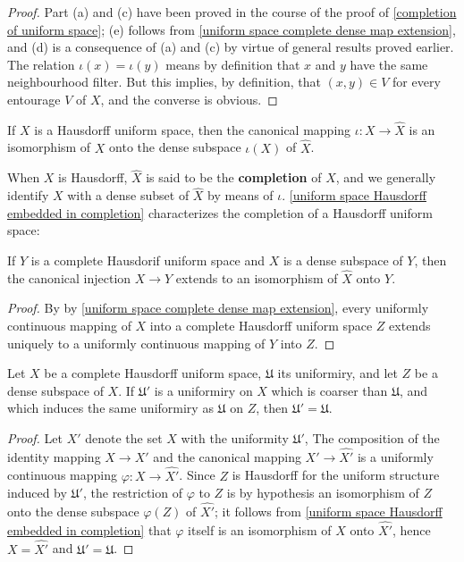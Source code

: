 \begin{proof}
Part (a) and (c) have been proved in the course of the proof of \cref{completion of uniform space}; (e) follows from \cref{uniform space complete dense map extension}, and (d) is a consequence of (a) and (c) by virtue of general results proved earlier. The relation $\iota(x)=\iota(y)$ means by definition that $x$ and $y$ have the same neighbourhood filter. But this implies, by definition, that $(x,y)\in V$ for every entourage $V$ of $X$, and the converse is obvious.
\end{proof}
\begin{corollary}\label{uniform space Hausdorff embedded in completion}
If $X$ is a Hausdorff uniform space, then the canonical mapping $\iota:X\to\widehat{X}$ is an isomorphism of $X$ onto the dense subspace $\iota(X)$ of $\widehat{X}$.
\end{corollary}
When $X$ is Hausdorff, $\widehat{X}$ is said to be the \textbf{completion} of $X$, and we generally identify $X$ with a dense subset of $\widehat{X}$ by means of $\iota$. \cref{uniform space Hausdorff embedded in completion} characterizes the completion of a Hausdorff uniform space:
\begin{proposition}\label{uniform complete Hausdorff dense subspace completion}
If $Y$ is a complete Hausdorif uniform space and $X$ is a dense subspace of $Y$, then the canonical injection $X\to Y$ extends to an isomorphism of $\widehat{X}$ onto $Y$.
\end{proposition}
\begin{proof}
By by \cref{uniform space complete dense map extension}, every uniformly continuous mapping of $X$ into a complete Hausdorff uniform space $Z$ extends uniquely to a uniformly continuous mapping of $Y$ into $Z$.
\end{proof}
\begin{proposition}\label{uniform complete Hausdorff coarser uniformity}
Let $X$ be a complete Hausdorff uniform space, $\mathfrak{U}$ its uniformiry, and let $Z$ be a dense subspace of $X$. If $\mathfrak{U}'$ is a uniformiry on $X$ which is coarser than $\mathfrak{U}$, and which induces the same uniformiry as $\mathfrak{U}$ on $Z$, then $\mathfrak{U}'=\mathfrak{U}$.
\end{proposition}
\begin{proof}
Let $X'$ denote the set $X$ with the uniformity $\mathfrak{U}'$, The composition of the identity mapping $X\to X'$ and the canonical mapping $X'\to\widehat{X'}$ is a uniformly continuous mapping $\varphi:X\to\widehat{X'}$. Since $Z$ is Hausdorff for the uniform structure induced by $\mathfrak{U}'$, the restriction of $\varphi$ to $Z$ is by hypothesis an isomorphism of $Z$ onto the dense subspace $\varphi(Z)$ of $\widehat{X'}$; it follows from \cref{uniform space Hausdorff embedded in completion} that $\varphi$ itself is an isomorphism of $X$ onto $\widehat{X'}$, hence $X=\widehat{X'}$ and $\mathfrak{U}'=\mathfrak{U}$.
\end{proof}
